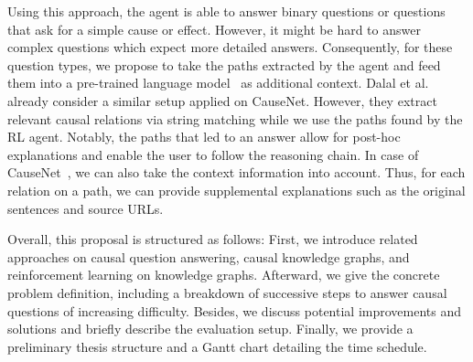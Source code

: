 Using this approach, the agent is able to answer binary questions or questions that ask for a simple cause or effect. However, it might be hard to answer complex questions which expect more detailed answers. Consequently, for these question types, we propose to take the paths extracted by the agent and feed them into a pre-trained language model~\cite{Vaswani2017Attention, Khashabi2020UnifiedQA} as additional context. 
Dalal et al.~\cite{DalalCausalQAEnhancing2021, DalalCausalQAISWC2021} already consider a similar setup applied on CauseNet. However, they extract relevant causal relations via string matching while we use the paths found by the RL agent. Notably, the paths that led to an answer allow for post-hoc explanations and enable the user to follow the reasoning chain. In case of CauseNet~\cite{Heindorf2020Causenet}, we can also take the context information into account. Thus, for each relation on a path, we can provide supplemental explanations such as the original sentences and source URLs.

Overall, this proposal is structured as follows: First, we introduce related approaches on causal question answering, causal knowledge graphs, and reinforcement learning on knowledge graphs. Afterward, we give the concrete problem definition, including a breakdown of successive steps to answer causal questions of increasing difficulty. Besides, we discuss potential improvements and solutions and briefly describe the evaluation setup. Finally, we provide a preliminary thesis structure and a Gantt chart detailing the time schedule.

